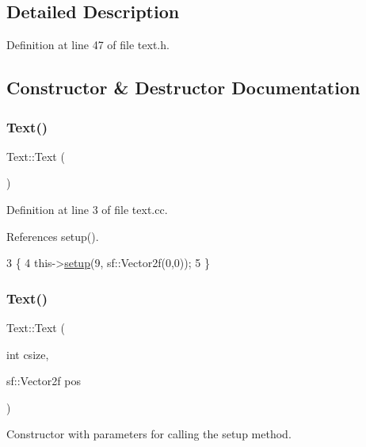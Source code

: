 \subsection{Detailed Description}


Definition at line 47 of file text.\+h.



\subsection{Constructor \& Destructor Documentation}
\mbox{\label{class_text_ab3e26143fccc52699bcc5149cae852bc}} 
\subsubsection{\texorpdfstring{Text()}{Text()}\hspace{0.1cm}{\footnotesize\ttfamily [1/2]}}
{\footnotesize\ttfamily Text\+::\+Text (\begin{DoxyParamCaption}{ }\end{DoxyParamCaption})}



Definition at line 3 of file text.\+cc.



References setup().


\begin{DoxyCode}
3            \{
4     this->\hyperlink{class_text_afde89d05e0de0f17092b8c56e6ac77df}{setup}(9, sf::Vector2f(0,0));
5 \}
\end{DoxyCode}
\mbox{\label{class_text_acf28836e4c129f524d6dc18963ed2391}} 
\subsubsection{\texorpdfstring{Text()}{Text()}\hspace{0.1cm}{\footnotesize\ttfamily [2/2]}}
{\footnotesize\ttfamily Text\+::\+Text (\begin{DoxyParamCaption}\item[{int}]{csize,  }\item[{sf\+::\+Vector2f}]{pos }\end{DoxyParamCaption})}



Constructor with parameters for calling the setup method. 


